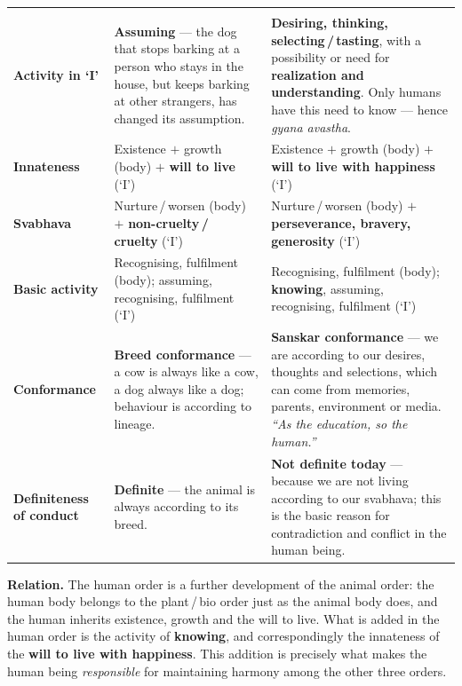 \renewcommand{\arraystretch}{1.3}
\begin{longtable}{P{28mm} P{60mm} P{60mm}}
 &  & 
  \\ \hline \endfirsthead
{} &  & 
  \\ \hline \endhead
\textbf{Activity in `I'} & \textbf{Assuming} --- the dog that stops barking at
  a person who stays in the house, but keeps barking at other strangers, has
  changed its assumption. &
  \textbf{Desiring, thinking, selecting\,/\,tasting}, with a possibility or
  need for \textbf{realization and understanding}. Only humans have this need
  to know --- hence \emph{gyana avastha}. \\ \hline
\textbf{Innateness} & Existence $+$ growth (body) $+$ \textbf{will to live}
  (`I') &
  Existence $+$ growth (body) $+$ \textbf{will to live with happiness} (`I')
  \\ \hline
\textbf{Svabhava} & Nurture\,/\,worsen (body) $+$ \textbf{non-cruelty\,/\,
  cruelty} (`I') &
  Nurture\,/\,worsen (body) $+$ \textbf{perseverance, bravery, generosity}
  (`I') \\ \hline
\textbf{Basic activity} & Recognising, fulfilment (body); assuming,
  recognising, fulfilment (`I') &
  Recognising, fulfilment (body); \textbf{knowing}, assuming, recognising,
  fulfilment (`I') \\ \hline
\textbf{Conformance} & \textbf{Breed conformance} --- a cow is always like a
  cow, a dog always like a dog; behaviour is according to lineage. &
  \textbf{Sanskar conformance} --- we are according to our desires, thoughts
  and selections, which can come from memories, parents, environment or media.
  \emph{``As the education, so the human.''} \\ \hline
\textbf{Definiteness of conduct} & \textbf{Definite} --- the animal is always
  according to its breed. &
  \textbf{Not definite today} --- because we are not living according to our
  svabhava; this is the basic reason for contradiction and conflict in the
  human being. \\ \hline
\end{longtable}

\textbf{Relation.} The human order is a further development of the animal
order: the human body belongs to the plant\,/\,bio order just as the animal
body does, and the human inherits existence, growth and the will to live. What
is added in the human order is the activity of \textbf{knowing}, and
correspondingly the innateness of the \textbf{will to live with happiness}.
This addition is precisely what makes the human being \emph{responsible} for
maintaining harmony among the other three orders.

